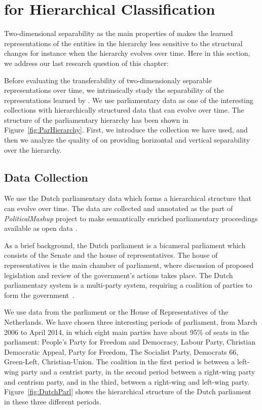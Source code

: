 \section{\achswlm for Hierarchical Classification}
Two\:-\:dimensional separability as the main properties of \achswlm makes the learned representations of the entities in the hierarchy less sensitive to the structural changes for instance when the hierarchy evolves over time. Here in this section, we address our last research question of this chapter:

Before evaluating the transferability of two\:-\:dimensionaly separable representations over time, we intrinsically study the separability of the representations learned by \achswlm. We use parliamentary data as one of the interesting collections with hierarchically structured data that can evolve over time. The structure of the parliamentary hierarchy has been shown in Figure~\ref{fig:ParHierarchy}.  First, we introduce the collection we have used, and then we analyze the quality of \achswlm on providing horizontal and vertical separability over the hierarchy. 

\subsection{Data Collection}
We use the Dutch parliamentary data which forms a hierarchical structure that can evolve over time. The data are collected and annotated as the part of
\emph{Political\-Mashup} project \citep{url:politicalmashup} to make semantically enriched parliamentary proceedings available as open data \citep{marx:2010}.

As a brief background, the Dutch parliament is a bicameral parliament which consists of the Senate and the house of representatives. The house of representatives is the main chamber of parliament, where discussion of proposed legislation and review of the government's actions takes place.  The Dutch parliamentary system is a multi-party system, requiring a coalition of parties to form the government~\citep{deswaan73}.


We use data from the parliament or the House of Representatives of the Netherlands.  We have chosen three interesting periods of parliament, from March 2006 to April 2014, in which eight main parties have about 95\% of seats in the parliament: People's Party for Freedom and Democracy, Labour Party, Christian Democratic Appeal, Party for Freedom, The Socialist Party, Democrats 66, Green-Left, Christian-Union.   The coalition in the first period is between a left-wing party and a centrist party, in the second period between a right-wing party and centrism party, and in the third, between a right-wing and left-wing party. Figure~\ref{fig:DutchParl} shows the hierarchical structure of the Dutch parliament in these three different periods.

